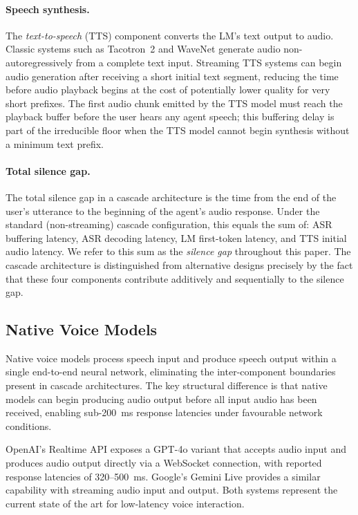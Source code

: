 \paragraph{Speech synthesis.}
The \emph{text-to-speech} (TTS) component converts the LM's text output to audio.
Classic systems such as Tacotron~2 \citep{shen2018natural} and WaveNet \citep{oord2016wavenet}
generate audio non-autoregressively from a complete text input.
Streaming TTS systems can begin audio generation after receiving a short initial text segment,
reducing the time before audio playback begins at the cost of potentially lower quality
for very short prefixes.
The first audio chunk emitted by the TTS model must reach the playback buffer before the
user hears any agent speech;
this buffering delay is part of the irreducible floor when the TTS model cannot begin
synthesis without a minimum text prefix.

\paragraph{Total silence gap.}
The total silence gap in a cascade architecture is the time from the end of the user's utterance
to the beginning of the agent's audio response.
Under the standard (non-streaming) cascade configuration, this equals the sum of:
ASR buffering latency, ASR decoding latency, LM first-token latency, and TTS initial audio latency.
We refer to this sum as the \emph{silence gap} throughout this paper.
The cascade architecture is distinguished from alternative designs precisely by the fact that
these four components contribute additively and sequentially to the silence gap.

\subsection{Native Voice Models}

Native voice models process speech input and produce speech output within a single end-to-end
neural network, eliminating the inter-component boundaries present in cascade architectures.
The key structural difference is that native models can begin producing audio output before
all input audio has been received, enabling sub-200~ms response latencies under favourable
network conditions.

OpenAI's Realtime API \citep{openai2024realtimeapi} exposes a GPT-4o variant that accepts
audio input and produces audio output directly via a WebSocket connection,
with reported response latencies of 320--500~ms.
Google's Gemini Live \citep{google2024geminivoice} provides a similar capability
with streaming audio input and output.
Both systems represent the current state of the art for low-latency voice interaction.

